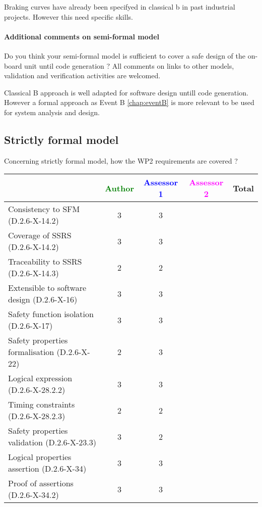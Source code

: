 \begin{author_comment}
Braking curves have already been specifyed in classical b  in past industrial projects. However this need specific skills.
\end{author_comment}



\paragraph{Additional comments on semi-formal  model} Do you think your semi-formal  model is sufficient to cover a safe design of the on-board unit until code generation ?
All comments on links to  other models, validation and verification activities are welcomed.



\begin{author_comment}
Classical B  approach is well adapted for software design untill code generation. However a formal approach as Event B \ref{chap:eventB} is more relevant to be used for system analysis and design.
\end{author_comment}


\subsection{Strictly formal model}

Concerning strictly formal model, how the WP2 requirements are covered ?

\begin{tabular}{|l | c | c | c | c|}
\hline
& \textcolor{green}{Author} & \textcolor{blue}{Assessor 1} & \textcolor{magenta}{Assessor 2} & Total \\
\hline 
Consistency to SFM (D.2.6-X-14.2) & 3 & 3 & &  \\
\hline
Coverage of SSRS (D.2.6-X-14.2)  & 3 & 3 & &  \\
\hline
Traceability to  SSRS (D.2.6-X-14.3)  & 2 & 2 & &  \\
\hline
Extensible to software design (D.2.6-X-16)  & 3 & 3 & &  \\
\hline
Safety function isolation (D.2.6-X-17)  & 3 & 3 & &  \\
\hline 
Safety properties formalisation (D.2.6-X-22)  & 2 & 3 & &  \\
\hline
Logical expression (D.2.6-X-28.2.2)  & 3 & 3 & &  \\
\hline
Timing constraints (D.2.6-X-28.2.3)  & 2 & 2 & &  \\
\hline
Safety properties validation (D.2.6-X-23.3)  & 3 & 2 & &  \\
\hline
Logical properties assertion (D.2.6-X-34)  & 3 & 3 & &  \\
\hline
Proof of assertions (D.2.6-X-34.2)  & 3 & 3 & &  \\
\hline
\end{tabular}




